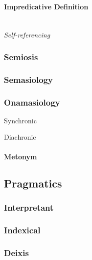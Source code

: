 \paragraph{Impredicative Definition}\label{sec:impredicative_definition}
\hfill \\

\emph{Self-referencing}



\subsubsection{Semiosis}\label{sec:semiosis}

\subsubsection{Semasiology}\label{sec:semasiology}

\subsubsection{Onamasiology}\label{sec:onamasiology}

Synchronic

Diachronic

\paragraph{Metonym}\label{sec:metonym}



\subsection{Pragmatics}\label{sec:pragmatics}

\subsubsection{Interpretant}\label{sec:interpretant}

\subsubsection{Indexical}\label{sec:indexical}

\subsubsection{Deixis}\label{sec:deixis}

